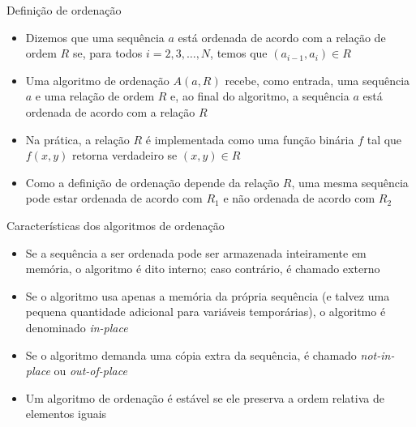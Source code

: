 \begin{frame}[fragile]{Definição de ordenação}

    \begin{itemize}
        \item Dizemos que uma sequência $a$ está ordenada de acordo com a relação de 
            ordem $R$ se, para todos $i = 2, 3, \ldots, N$, temos que $(a_{i - 1}, a_i) \in R$

        \item Uma algoritmo de ordenação $A(a, R)$ recebe, como entrada, uma sequência $a$ e 
            uma relação de ordem $R$ e, ao final do algoritmo, a sequência $a$ está ordenada de 
            acordo com a relação $R$

        \item Na prática, a relação $R$ é implementada como uma função binária $f$ tal que
            $f(x, y)$ retorna verdadeiro se $(x, y)\in R$

        \item Como a definição de ordenação depende da relação $R$, uma mesma sequência pode
            estar ordenada de acordo com $R_1$ e não ordenada de acordo com $R_2$

    \end{itemize}

\end{frame}

\begin{frame}[fragile]{Características dos algoritmos de ordenação}

    \begin{itemize}
        \item Se a sequência a ser ordenada pode ser armazenada inteiramente em memória, o 
            algoritmo é dito interno; caso contrário, é chamado externo

        \item Se o algoritmo usa apenas a memória da própria sequência (e talvez uma pequena
            quantidade adicional para variáveis temporárias), o algoritmo é denominado
            \textit{in-place}

        \item Se o algoritmo demanda uma cópia extra da sequência, é chamado \textit{not-in-place}
            ou \textit{out-of-place}

        \item Um algoritmo de ordenação é estável se ele preserva a ordem relativa de elementos 
            iguais

    \end{itemize}

\end{frame}
